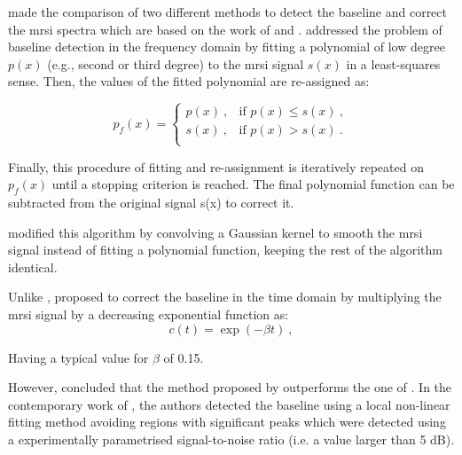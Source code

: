 \begin{enumerate}[leftmargin=*]
\cite{Parfait2012} made the comparison of two different methods to detect the baseline and correct the \ac{mrsi} spectra which are based on the work of \cite{Lieber2003} and \cite{Devos2004}. \cite{Lieber2003} addressed the problem of baseline detection in the frequency domain by fitting a polynomial of low degree $p(x)$ (e.g., second or third degree) to the \ac{mrsi} signal $s(x)$ in a least-squares sense. Then, the values of the fitted polynomial are re-assigned as:

\begin{equation}
	p_f(x) = 
	\begin{cases}
		p(x) \ , & \text{if $p(x) \leq s(x)$} \ , \\
		s(x) \ , & \text{if $p(x) > s(x)$} \ . \\
	\end{cases}
	\label{eq:lieber}
\end{equation}

Finally, this procedure of fitting and re-assignment is iteratively repeated on $p_f(x)$ until a stopping criterion is reached. The final polynomial function can be subtracted from the original signal s(x) to correct it.

\cite{Parfait2012} modified this algorithm by convolving a Gaussian kernel to smooth the \ac{mrsi} signal instead of fitting a polynomial function, keeping the rest of the algorithm identical. 

Unlike \cite{Lieber2003}, \cite{Devos2004} proposed to correct the baseline in the time domain by multiplying the \ac{mrsi} signal by a decreasing exponential function as:
\begin{equation}
	c(t) = \exp (- \beta t) \ ,
	\label{eq:devos}
\end{equation}

\noindent Having a typical value for $\beta$ of 0.15.

However, \cite{Parfait2012} concluded that the method proposed by \cite{Lieber2003} outperforms the one of \cite{Devos2004}. In the contemporary work of \cite{Tiwari2012}, the authors detected the baseline using a local non-linear fitting method avoiding regions with significant peaks which were detected using a experimentally parametrised signal-to-noise ratio (i.e. a value larger than 5 dB).


\end{enumerate}
